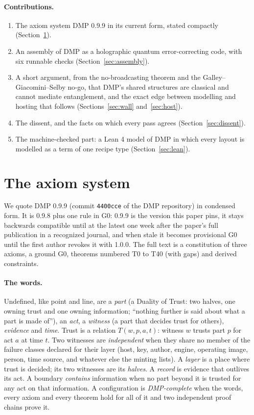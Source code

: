 \documentclass[11pt,a4paper]{article}
\theoremstyle{definition}
\theoremstyle{remark}
\begin{document}
\paragraph{Contributions.}
\begin{enumerate}[nosep]
\item The axiom system DMP 0.9.9 in its current form, stated compactly (Section~\ref{sec:dmp}).
\item An assembly of DMP as a holographic quantum error-correcting code, with six runnable checks (Section~\ref{sec:assembly}).
\item A short argument, from the no-broadcasting theorem and the Galley--Giacomini--Selby no-go, that DMP's shared structures are
classical and cannot mediate entanglement, and the exact edge between modelling and hosting that follows (Sections~\ref{sec:wall}
and~\ref{sec:host}).
\item The dissent, and the facts on which every pass agrees (Section~\ref{sec:dissent}).
\item The machine-checked part: a Lean 4 model of DMP in which every layout is modelled as a term of one recipe type (Section~\ref{sec:lean}).
\end{enumerate}

\section{The axiom system}\label{sec:dmp}

We quote DMP 0.9.9 (commit \texttt{4400cce} of the DMP repository) in condensed form. It is 0.9.8 plus one rule in G0: 0.9.9 is the
version this paper pins, it stays backwards compatible until at the latest one week after the paper's full publication in a recognized
journal, and when stale it becomes provisional G0 until the first author revokes it with 1.0.0. The full text is a constitution of three axioms, a
ground G0, theorems numbered T0 to T40 (with gaps) and derived constraints.

\paragraph{The words.} Undefined, like point and line, are a \emph{part} (a Duality of Trust: two halves, one owning trust and one owning
information; ``nothing further is said about what a part is made of''), an \emph{act}, a \emph{witness} (a part that decides trust for
others), \emph{evidence} and \emph{time}. Trust is a relation $T(w,p,a,t)$: witness $w$ trusts part $p$ for act $a$ at time $t$. Two
witnesses are \emph{independent} when they share no member of the failure classes declared for their layer (host, key, author, engine,
operating image, person, time source, and whatever else the minting lists). A \emph{layer} is a place where trust is decided; its two
witnesses are its \emph{halves}. A \emph{record} is evidence that outlives its act. A boundary \emph{contains} information when no part
beyond it is trusted for any act on that information. A configuration is \emph{DMP-complete} when the words, every axiom and every
theorem hold for all of it and two independent proof chains prove it.
\end{document}
